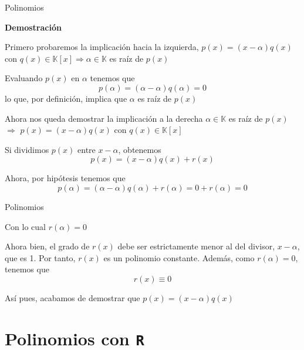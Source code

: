 \documentclass[
  ignorenonframetext,
]{beamer}
\begin{document}
\begin{frame}{Polinomios}
\protect\hypertarget{polinomios-9}{}

\textbf{Demostración}

Primero probaremos la implicación hacia la izquierda,
\(p(x)=(x-\alpha)q(x)\) con
\(q(x)\in\mathbb{K}[x]\Rightarrow\)\(\alpha\in\mathbb{K}\) es raíz de
\(p(x)\)

Evaluando \(p(x)\) en \(\alpha\) tenemos que
\[p(\alpha)=(\alpha-\alpha)q(\alpha) = 0\] lo que, por definición,
implica que \(\alpha\) es raíz de \(p(x)\)

Ahora nos queda demostrar la implicación a la derecha
\(\alpha\in\mathbb{K}\) es raíz de \(p(x)\) \(\Rightarrow\)
\(p(x)=(x-\alpha)q(x)\) con \(q(x)\in\mathbb{K}[x]\)

Si dividimos \(p(x)\) entre \(x-\alpha\), obtenemos
\[p(x) = (x-\alpha)q(x)+r(x)\]

Ahora, por hipótesis tenemos que
\[p(\alpha) = (\alpha-\alpha)q(\alpha)+r(\alpha) = 0 +r(\alpha) = 0\]

\end{frame}

\begin{frame}{Polinomios}
\protect\hypertarget{polinomios-10}{}

Con lo cual \(r(\alpha) = 0\)

Ahora bien, el grado de \(r(x)\) debe ser estrictamente menor al del
divisor, \(x-\alpha\), que es 1. Por tanto, \(r(x)\) es un polinomio
constante. Además, como \(r(\alpha) =0\), tenemos que \[r(x)\equiv 0\]

Así pues, acabamos de demostrar que \(p(x) = (x-\alpha)q(x)\)

\end{frame}

\hypertarget{polinomios-con-r}{%
\section{\texorpdfstring{Polinomios con
\texttt{R}}{Polinomios con R}}\label{polinomios-con-r}}
\end{document}
